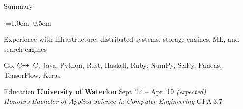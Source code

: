 \documentclass{resume} %
\begin{document}

\begin{rSection}{Summary}
  \vspace{0.5em}
  \begin{list}{$\cdot$}{\leftmargin=1.0em}
    \itemsep -0.5em \vspace{-0.5em}
    \item Experience with infrastructure, distributed systems, storage engines,
      ML, and search engines
    \item Go, C\texttt{++}, C, Java, Python, Rust, Haskell, Ruby; NumPy, SciPy,
      Pandas, TensorFlow, Keras
  \end{list}
  \vspace{0.5em}
\end{rSection}


\begin{rSection}{Education}
  {\bf University of Waterloo} \hfill {Sept '14 -- Apr '19 \em (expected)} \\
  {\em Honours Bachelor of Applied Science in Computer Engineering} \hfill {GPA 3.7}
  \vspace{0.5em}
\end{rSection}

\end{document}

